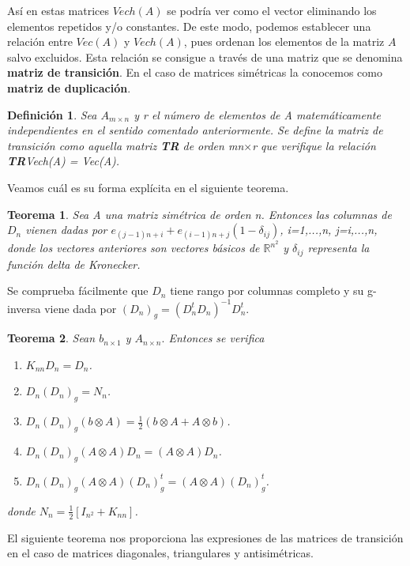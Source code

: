 \documentclass{article}
\theoremstyle{theorem-style}  %
\newtheorem{theorem}{Teorema}[section]  %
\theoremstyle{definition-style}
\newtheorem{definition}{Definición}[section]
\theoremstyle{example-style}
\theoremstyle{exercise-style}
\begin{document}
	Así en estas matrices $Vech(A)$ se podría ver como el vector eliminando los elementos repetidos y/o constantes. De este modo, podemos establecer una relación entre $Vec(A)$ y $Vech(A)$, pues ordenan los elementos de la matriz $A$ salvo excluidos. Esta relación se consigue a través de una matriz que se denomina \textbf{matriz de transición}. En el caso de matrices simétricas la conocemos como \textbf{matriz de duplicación}.
	
	\begin{definition}
		Sea $A_{m\times n}$ y r el número de elementos de A matemáticamente independientes en el sentido comentado anteriormente. Se define la matriz de transición como aquella matriz \textbf{TR} de orden mn$\times$r que verifique la relación \textbf{TR}Vech(A) = Vec(A).
	\end{definition}
	
	Veamos cuál es su forma explícita en el siguiente teorema.
	
	\begin{theorem}
		Sea A una matriz simétrica de orden n. Entonces las columnas de $D_n$ vienen dadas por $e_{(j-1)n+i}+e_{(i-1)n+j}(1-\delta_{ij})$, i=1,...,n, j=i,...,n, donde los vectores anteriores son vectores básicos de $\mathbb{R}^{n^2}$ y $\delta_{ij}$ representa la función delta de Kronecker.
	\end{theorem}
	
	Se comprueba fácilmente que $D_n$ tiene rango por columnas completo y su g-inversa viene dada por $(D_n)_g = (D^t_nD_n)^{-1}D_n^t$.
	
	\begin{theorem}
		Sean $b_{n\times 1}$ y $A_{n\times n}.$ Entonces se verifica
		\begin{enumerate}
			\item $K_{nn}D_n = D_n$.
			\item $D_n(D_n)_g=N_n$.
			\item $D_n(D_n)_g(b\otimes A) = \frac{1}{2}(b\otimes A + A\otimes b)$.
			\item $D_n(D_n)_g(A\otimes A)D_n = (A\otimes A)D_n$.
			\item $D_n(D_n)_g(A\otimes A)(D_n)_g^t = (A\otimes A)(D_n)^t_g$.
		\end{enumerate}
		donde $N_n = \frac{1}{2}[I_{n^2}+K_{nn}]$.
	\end{theorem}
	
	El siguiente teorema nos proporciona las expresiones de las matrices de transición en el caso de matrices diagonales, triangulares y antisimétricas.
	
\end{document}
